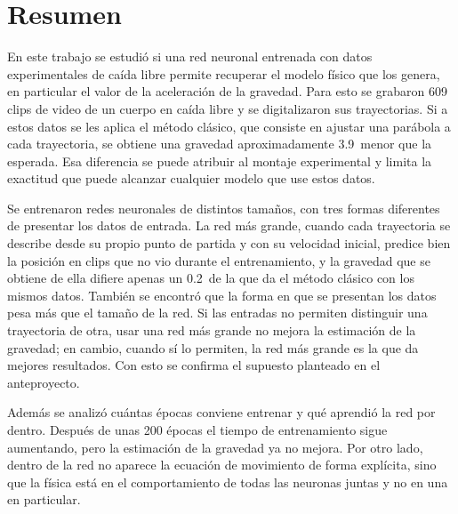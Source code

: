 \documentclass[titlepage,11pt]{article}
\providecommand{\SI}[2]{#1\,#2}
\providecommand{\percent}{\char37\relax}
\begin{document}
\pagestyle{empty}
\setcounter{page}{0}

\section*{Resumen}

En este trabajo se estudió si una red neuronal entrenada con datos
experimentales de caída libre permite recuperar el modelo físico que los
genera, en particular el valor de la aceleración de la gravedad. Para esto se
grabaron 609 clips de video de un cuerpo en caída libre y se digitalizaron sus
trayectorias. Si a estos datos se les aplica el método clásico, que consiste en
ajustar una parábola a cada trayectoria, se obtiene una gravedad
aproximadamente \SI{3.9}{\percent} menor que la esperada. Esa diferencia se
puede atribuir al montaje experimental y limita la exactitud que puede alcanzar
cualquier modelo que use estos datos.

Se entrenaron redes neuronales de distintos tamaños, con tres formas diferentes
de presentar los datos de entrada. La red más grande, cuando cada trayectoria se
describe desde su propio punto de partida y con su velocidad inicial, predice
bien la posición en clips que no vio durante el entrenamiento, y la gravedad que
se obtiene de ella difiere apenas un \SI{0.2}{\percent} de la que da el método
clásico con los mismos datos. También se encontró que la forma en que se
presentan los datos pesa más que el tamaño de la red. Si las entradas no
permiten distinguir una trayectoria de otra, usar una red más grande no mejora
la estimación de la gravedad; en cambio, cuando sí lo permiten, la red más
grande es la que da mejores resultados. Con esto se confirma el supuesto
planteado en el anteproyecto.

Además se analizó cuántas épocas conviene entrenar y qué aprendió la red por
dentro. Después de unas 200 épocas el tiempo de entrenamiento sigue aumentando,
pero la estimación de la gravedad ya no mejora. Por otro lado, dentro de la red
no aparece la ecuación de movimiento de forma explícita, sino que la física
está en el comportamiento de todas las neuronas juntas y no en una en
particular.
\end{document}
